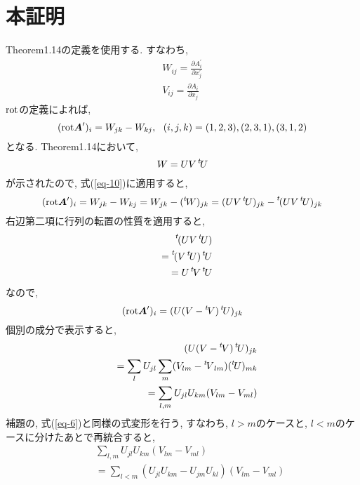 \documentclass{jsarticle}
\newcommand*{\mbold}[1]{\mbox{\boldmath $#1$}}
\newcommand*{\transp}[1]{\prescript{t\!}{}{#1}}
\newcommand*{\rot}{{\rm rot}}
\begin{document}
\section{本証明}
Theorem1.14の定義を使用する. すなわち, 
\begin{subequations}
  \begin{eqnarray}
    W_{ij} = \frac{\partial A_i^\prime}{\partial x_j^\prime} \\
    V_{ij} = \frac{\partial A_i}{\partial x_j}
  \end{eqnarray}
\end{subequations}
$\rot$の定義によれば, 
\begin{equation}\label{eq-10}
  (\rot \mbold{A}^\prime)_i = W_{jk} - W_{kj}, 
  ~~ (i, j, k) = (1, 2, 3), (2, 3, 1), (3, 1, 2)
\end{equation}
となる. Theorem1.14において, 
\begin{equation}
  W = UV\transp{U}
\end{equation}
が示されたので, 式(\ref{eq-10})に適用すると, 
\begin{equation}
  (\rot \mbold{A}^\prime)_i = W_{jk} - W_{kj} = W_{jk} - (\transp{W})_{jk}
  = (UV\transp{U})_{jk} - \transp(UV\transp{U})_{jk}
\end{equation}
右辺第二項に行列の転置の性質を適用すると, 
\begin{eqnarray}
  && \transp(UV\transp{U}) \nonumber \\
  && = \transp(V\transp{U})\transp{U} \nonumber \\
  && = U\transp{V}\transp{U}
\end{eqnarray}
なので, 
\begin{equation}
  (\rot \mbold{A}^\prime)_i = (U(V - \transp{V})\transp{U})_{jk}
\end{equation}
個別の成分で表示すると, 
\begin{eqnarray}
  && (U(V - \transp{V})\transp{U})_{jk} \nonumber \\
  && = \sum_l U_{jl} \sum_m (V_{lm} - \transp{V}_{lm})(\transp{U})_{mk} \nonumber \\
  && = \sum_{l, m} U_{jl}U_{km} (V_{lm} - V_{ml})
\end{eqnarray}
補題の, 式(\ref{eq-6})と同様の式変形を行う, すなわち, $l > m$のケースと, $l < m$のケースに分けたあとで再統合すると, 
\begin{eqnarray}\label{eq-18}
  && \sum_{l, m} U_{jl}U_{km} (V_{lm} - V_{ml}) \nonumber \\
  && = \sum_{l < m} (U_{jl}U_{km} - U_{jm}U_{kl})(V_{lm} - V_{ml})
\end{eqnarray}
\end{document}
